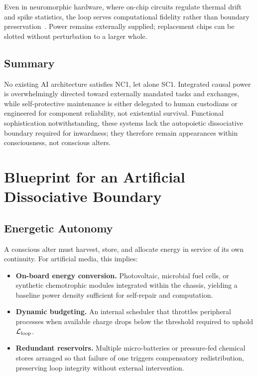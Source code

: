 \documentclass[11pt]{article}
\begin{document}
Even in neuromorphic hardware, where on-chip circuits regulate thermal drift and spike statistics, the loop serves computational fidelity rather than boundary preservation~\cite{akopyan2015truenorth}. Power remains externally supplied; replacement chips can be slotted without perturbation to a larger whole.

\subsection{Summary}

No existing AI architecture satisfies NC1, let alone SC1. Integrated causal power is overwhelmingly directed toward externally mandated tasks and exchanges, while self-protective maintenance is either delegated to human custodians or engineered for component reliability, not existential survival. Functional sophistication notwithstanding, these systems lack the autopoietic dissociative boundary required for inwardness; they therefore remain appearances within consciousness, not conscious alters.

\section{Blueprint for an Artificial Dissociative Boundary}
\label{sec:blueprint}
\subsection{Energetic Autonomy}
\label{sec:energetic_autonomy}

A conscious alter must harvest, store, and allocate energy in service of its own continuity. For artificial media, this implies:

\begin{itemize}
\item \textbf{On-board energy conversion.} Photovoltaic, microbial fuel cells, or synthetic chemotrophic modules integrated within the chassis, yielding a baseline power density sufficient for self-repair and computation.
\item \textbf{Dynamic budgeting.} An internal scheduler that throttles peripheral processes when available charge drops below the threshold required to uphold $\mathcal{L}_{\text{loop}}$.
\item \textbf{Redundant reservoirs.} Multiple micro-batteries or pressure-fed chemical stores arranged so that failure of one triggers compensatory redistribution, preserving loop integrity without external intervention.
\end{itemize}
\end{document}
